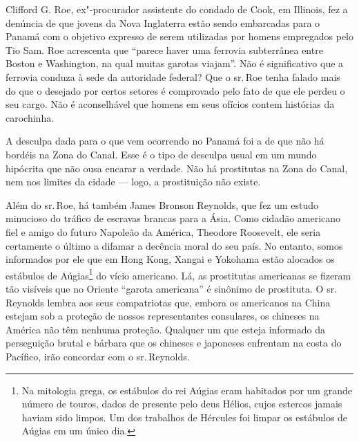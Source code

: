 Clifford G. Roe, ex"-procurador assistente do condado de Cook, em
Illinois, fez a denúncia de que jovens da Nova Inglaterra estão sendo
embarcadas para o Panamá com o objetivo expresso de serem
utilizadas por homens empregados pelo Tio Sam. Roe acrescenta que
``parece haver uma ferrovia subterrânea entre Boston e Washington, na
qual muitas garotas viajam''. Não é significativo que a ferrovia conduza
à sede da autoridade federal? Que o sr.\,Roe tenha falado mais do que o
desejado por certos setores é comprovado pelo fato de que ele perdeu o seu
cargo. Não é aconselhável que homens em seus ofícios contem histórias da
carochinha.

A desculpa dada para o que vem ocorrendo no Panamá foi a de que não há
bordéis na Zona do Canal. Esse é o tipo de desculpa usual em um mundo
hipócrita que não ousa encarar a verdade. Não há prostitutas na Zona do
Canal, nem nos limites da cidade --- logo, a prostituição não existe.

Além do sr.\,Roe, há também James Bronson Reynolds, que fez um estudo
minucioso do tráfico de escravas brancas para a Ásia. Como cidadão
americano fiel e amigo do futuro Napoleão da América, Theodore
Roosevelt, ele seria certamente o último a difamar a decência moral do
seu país. No entanto, somos informados por ele que em Hong Kong, Xangai e
Yokohama estão alocados os estábulos de Aúgias\footnote{Na
  mitologia grega, os estábulos do rei Aúgias eram habitados por um
  grande número de touros, dados de presente pelo deus Hélios, cujos
  estercos jamais haviam sido limpos. Um dos trabalhos de Hércules foi
  limpar os estábulos de Aúgias em um único dia.} do vício americano. Lá,
as prostitutas americanas se fizeram tão visíveis que no Oriente
``garota americana'' é sinônimo de prostituta. O sr.\,Reynolds lembra aos
seus compatriotas que, embora os americanos na China estejam sob a
proteção de nossos representantes consulares, os chineses na América não
têm nenhuma proteção. Qualquer um que esteja informado da perseguição
brutal e bárbara que os chineses e japoneses enfrentam na costa do
Pacífico, irão concordar com o sr.\,Reynolds.

